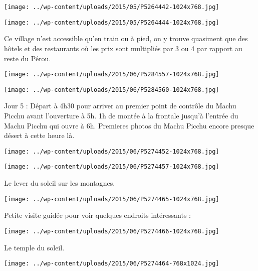  \newline
\centerline{\texttt{[image: ../wp-content/uploads/2015/05/P5264442-1024x768.jpg]} } 
 \newline
 \newline
\centerline{\texttt{[image: ../wp-content/uploads/2015/05/P5264444-1024x768.jpg]} } 
 \newline
 Ce village n'est accessible qu'en train ou à pied, on y trouve quasiment que des hôtels et des restaurants où les prix sont multipliés par 3 ou 4 par rapport au reste du Pérou. \newline
 \newline
\centerline{\texttt{[image: ../wp-content/uploads/2015/06/P5284557-1024x768.jpg]} } 
 \newline
 \newline
\centerline{\texttt{[image: ../wp-content/uploads/2015/06/P5284560-1024x768.jpg]} } 
 \newline
 Jour 5 : \newline
 Départ à 4h30 pour arriver au premier point de contrôle du Machu Picchu avant l'ouverture à 5h. \newline
 1h de montée à la frontale jusqu'à l'entrée du Machu Picchu qui ouvre à 6h. \newline
 Premieres photos du Machu Picchu encore presque désert à cette heure là. \newline
 \newline
\centerline{\texttt{[image: ../wp-content/uploads/2015/06/P5274452-1024x768.jpg]} } 
 \newline
 \newline
\centerline{\texttt{[image: ../wp-content/uploads/2015/06/P5274457-1024x768.jpg]} } 
 \newline
 Le lever du soleil sur les montagnes. \newline
 \newline
\centerline{\texttt{[image: ../wp-content/uploads/2015/06/P5274465-1024x768.jpg]} } 
 \newline
 Petite visite guidée pour voir quelques endroits intéressants : \newline
 \newline
\centerline{\texttt{[image: ../wp-content/uploads/2015/06/P5274466-1024x768.jpg]} } 
 \newline
 Le temple du soleil. \newline
 \newline
\centerline{\texttt{[image: ../wp-content/uploads/2015/06/P5274464-768x1024.jpg]} } 
